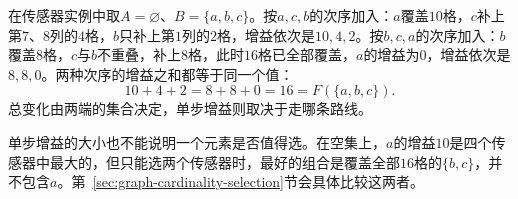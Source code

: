 在传感器实例中取$A=\varnothing$、$B=\{a,b,c\}$。按$a,c,b$的次序加入：$a$覆盖$10$格，$c$补上第$7$、$8$列的$4$格，$b$只补上第$1$列的$2$格，增益依次是$10,4,2$。按$b,c,a$的次序加入：$b$覆盖$8$格，$c$与$b$不重叠，补上$8$格，此时$16$格已全部覆盖，$a$的增益为$0$，增益依次是$8,8,0$。两种次序的增益之和都等于同一个值：
\[
  10+4+2=8+8+0=16=F(\{a,b,c\}).
\]
总变化由两端的集合决定，单步增益则取决于走哪条路线。

单步增益的大小也不能说明一个元素是否值得选。在空集上，$a$的增益$10$是四个传感器中最大的，但只能选两个传感器时，最好的组合是覆盖全部$16$格的$\{b,c\}$，并不包含$a$。第~\ref{sec:graph-cardinality-selection}节会具体比较这两者。
